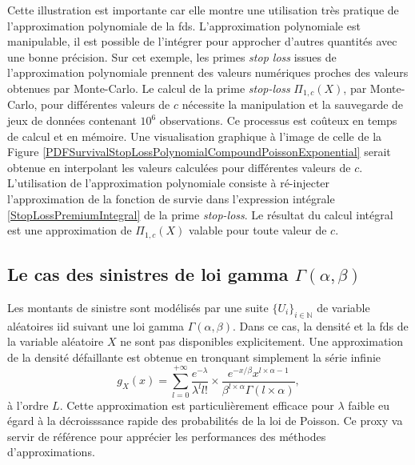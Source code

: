 Cette illustration est importante car elle montre une utilisation très pratique de l\rq{}approximation polynomiale de la \gls{fds}. L\rq{}approximation polynomiale est manipulable, il est possible de l\rq{}intégrer pour approcher d\rq{}autres quantités avec une bonne précision. Sur cet exemple, les primes \textit{stop loss} issues de l\rq{}approximation polynomiale prennent des valeurs numériques proches des valeurs obtenues par Monte-Carlo. Le calcul de la prime \textit{stop-loss} $\Pi_{1,c}(X)$, par Monte-Carlo, pour différentes valeurs de $c$ nécessite la manipulation et la sauvegarde de jeux de données contenant $10^{6}$ observations. Ce processus est coûteux en temps de calcul et en mémoire. Une visualisation graphique à l\rq{}image de celle de la Figure \ref{PDFSurvivalStopLossPolynomialCompoundPoissonExponential} serait obtenue en interpolant les valeurs calculées pour différentes valeurs de $c$. L\rq{}utilisation de l\rq{}approximation polynomiale consiste à ré-injecter l\rq{}approximation de la fonction de survie dans l\rq{}expression intégrale \eqref{StopLossPremiumIntegral} de la prime \textit{stop-loss}. Le résultat du calcul intégral est une approximation de $\Pi_{1,c}(X)$ valable pour toute valeur de $c$. 
\subsection{Le cas des sinistres de loi gamma $\Gamma(\alpha,\beta)$}
Les montants de sinistre sont modélisés par une suite $\{U_{i}\}_{i\in\mathbb{N}}$ de variable aléatoires \gls{iid} suivant une loi gamma $\Gamma(\alpha,\beta)$. Dans ce cas, la densité et la \gls{fds} de la variable aléatoire $X$ ne sont pas disponibles explicitement. Une approximation de la densité défaillante est obtenue en tronquant simplement la série infinie
\begin{equation*}
g_{X}(x)=\sum_{l=0}^{+\infty}\frac{e^{-\lambda}}{\lambda^{l}{l!}}\times\frac{e^{-x/\beta}x^{l\times\alpha-1}}{\beta^{l\times\alpha}\Gamma(l\times\alpha)},
\end{equation*}
à l'ordre $L$. Cette approximation est particulièrement efficace pour $\lambda$ faible eu égard à la décroisssance rapide des probabilités de la loi de Poisson. Ce proxy va servir de référence pour apprécier les performances des méthodes d'approximations.\\

